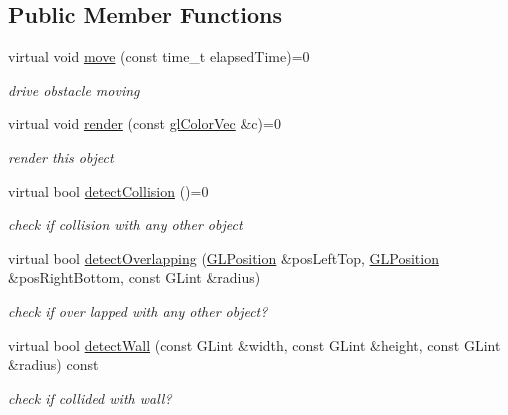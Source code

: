 \subsection*{Public Member Functions}
\begin{DoxyCompactItemize}
\item 
\hypertarget{classObject_a0307ab0a90c744dd7eb65fec04607686}{virtual void \hyperlink{classObject_a0307ab0a90c744dd7eb65fec04607686}{move} (const time\-\_\-t elapsed\-Time)=0}\label{classObject_a0307ab0a90c744dd7eb65fec04607686}

\begin{DoxyCompactList}\small\item\em drive obstacle moving \end{DoxyCompactList}\item 
\hypertarget{classObject_a9f985500da322266d7782ab2cc5e6eaf}{virtual void \hyperlink{classObject_a9f985500da322266d7782ab2cc5e6eaf}{render} (const \hyperlink{Common_8h_a5113b6588451c418d38d8b3681eb6040}{gl\-Color\-Vec} \&c)=0}\label{classObject_a9f985500da322266d7782ab2cc5e6eaf}

\begin{DoxyCompactList}\small\item\em render this object \end{DoxyCompactList}\item 
\hypertarget{classObject_a56f456af2b1ba5a34c27f9b4c5d10dda}{virtual bool \hyperlink{classObject_a56f456af2b1ba5a34c27f9b4c5d10dda}{detect\-Collision} ()=0}\label{classObject_a56f456af2b1ba5a34c27f9b4c5d10dda}

\begin{DoxyCompactList}\small\item\em check if collision with any other object \end{DoxyCompactList}\item 
virtual bool \hyperlink{classObject_abba9760277a437884404992f926d2e4d}{detect\-Overlapping} (\hyperlink{structGLPosition}{G\-L\-Position} \&pos\-Left\-Top, \hyperlink{structGLPosition}{G\-L\-Position} \&pos\-Right\-Bottom, const G\-Lint \&radius)
\begin{DoxyCompactList}\small\item\em check if over lapped with any other object? \end{DoxyCompactList}\item 
virtual bool \hyperlink{classObject_ad9adac7de77247bd045a43c317794899}{detect\-Wall} (const G\-Lint \&width, const G\-Lint \&height, const G\-Lint \&radius) const 
\begin{DoxyCompactList}\small\item\em check if collided with wall? \end{DoxyCompactList}\end{DoxyCompactItemize}

